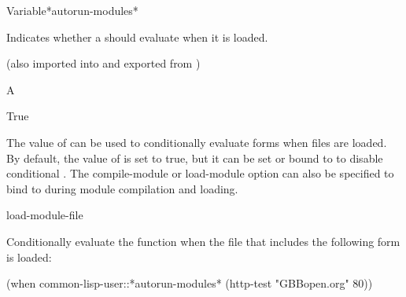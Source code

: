 \documentclass[10pt,twoside,english,pdftex]{article}
\begin{document}
\begin{functiondoc}{Variable}{*autorun-modules*}{}%
% 

\fnsyntax

\fnpurpose Indicates whether a  should evaluate
 when it is loaded.

\fnpackage {}
(also imported into and exported from )

\fnmodule {}

\fnvaluetype A 

\fninitialvalue True

\fndescription The value of  can be used to
conditionally evaluate forms when  files are loaded.  By
default, the value of  is set to true, but it
can be set or bound to \nil{} to disable conditional .
The compile-module or load-module option  can also be
specified to bind  to \nil{} during module
compilation and loading.

\begin{alsos}{load-module-file}
\end{alsos}

\fnexample
Conditionally evaluate the  function when the file 
 that includes the following form is loaded:
%
\W\supp
\begin{example}
  (when common-lisp-user::*autorun-modules*
    (http-test "GBBopen.org" 80))
\end{example}

\end{functiondoc}

\end{document}

